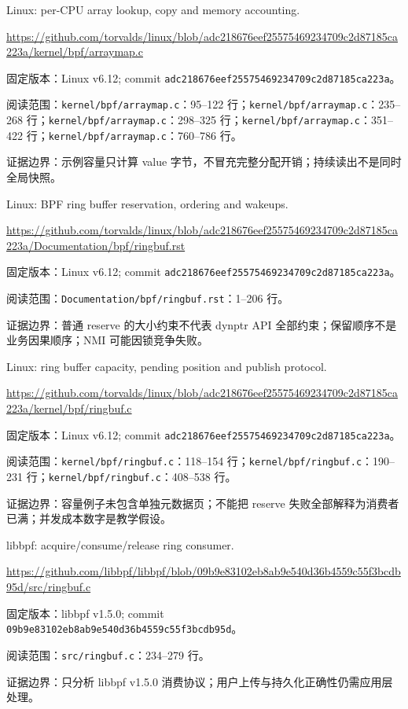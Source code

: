 \documentclass[UTF8,fontset=fandol,openany,11pt]{ctexbook}
\begin{document}
\begin{thebibliography}{999}
 Linux: per-CPU array lookup, copy and memory accounting.\par
\url{https://github.com/torvalds/linux/blob/adc218676eef25575469234709c2d87185ca223a/kernel/bpf/arraymap.c}\par
{\small\raggedright 固定版本：Linux v6.12; commit \texttt{adc21867\allowbreak{}6eef2557\allowbreak{}54692347\allowbreak{}09c2d871\allowbreak{}85ca223a}。\par
阅读范围：\nolinkurl{kernel/bpf/arraymap.c}：95–122 行；\nolinkurl{kernel/bpf/arraymap.c}：235–268 行；\nolinkurl{kernel/bpf/arraymap.c}：298–325 行；\nolinkurl{kernel/bpf/arraymap.c}：351–422 行；\nolinkurl{kernel/bpf/arraymap.c}：760–786 行。\par
证据边界：示例容量只计算 value 字节，不冒充完整分配开销；持续读出不是同时全局快照。
}

 Linux: BPF ring buffer reservation, ordering and wakeups.\par
\url{https://github.com/torvalds/linux/blob/adc218676eef25575469234709c2d87185ca223a/Documentation/bpf/ringbuf.rst}\par
{\small\raggedright 固定版本：Linux v6.12; commit \texttt{adc21867\allowbreak{}6eef2557\allowbreak{}54692347\allowbreak{}09c2d871\allowbreak{}85ca223a}。\par
阅读范围：\nolinkurl{Documentation/bpf/ringbuf.rst}：1–206 行。\par
证据边界：普通 reserve 的大小约束不代表 dynptr API 全部约束；保留顺序不是业务因果顺序；NMI 可能因锁竞争失败。
}

 Linux: ring buffer capacity, pending position and publish protocol.\par
\url{https://github.com/torvalds/linux/blob/adc218676eef25575469234709c2d87185ca223a/kernel/bpf/ringbuf.c}\par
{\small\raggedright 固定版本：Linux v6.12; commit \texttt{adc21867\allowbreak{}6eef2557\allowbreak{}54692347\allowbreak{}09c2d871\allowbreak{}85ca223a}。\par
阅读范围：\nolinkurl{kernel/bpf/ringbuf.c}：118–154 行；\nolinkurl{kernel/bpf/ringbuf.c}：190–231 行；\nolinkurl{kernel/bpf/ringbuf.c}：408–538 行。\par
证据边界：容量例子未包含单独元数据页；不能把 reserve 失败全部解释为消费者已满；并发成本数字是教学假设。
}

 libbpf: acquire/consume/release ring consumer.\par
\url{https://github.com/libbpf/libbpf/blob/09b9e83102eb8ab9e540d36b4559c55f3bcdb95d/src/ringbuf.c}\par
{\small\raggedright 固定版本：libbpf v1.5.0; commit \texttt{09b9e831\allowbreak{}02eb8ab9\allowbreak{}e540d36b\allowbreak{}4559c55f\allowbreak{}3bcdb95d}。\par
阅读范围：\nolinkurl{src/ringbuf.c}：234–279 行。\par
证据边界：只分析 libbpf v1.5.0 消费协议；用户上传与持久化正确性仍需应用层处理。
}


\end{thebibliography}
\end{document}
